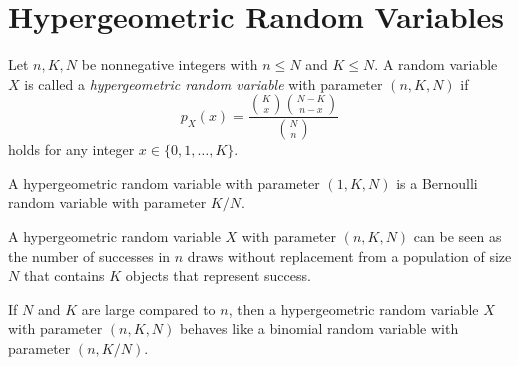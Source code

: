 \section{Hypergeometric Random Variables}
\begin{definition}
  Let $n, K, N$ be nonnegative integers with $n \leq N$ and $K \leq N$.
  A random variable $X$ is called a \emph{hypergeometric random variable}
  with parameter $(n, K, N)$ if
  \begin{equation*}
    p_X(x) = \frac{\binom{K}{x}\binom{N-K}{n-x}}{\binom{N}{n}}
  \end{equation*}
  holds for any integer $x \in \{0, 1, \dots, K\}$.
\end{definition}
\begin{remark}
  A hypergeometric random variable with parameter $(1, K, N)$ is a Bernoulli
  random variable with parameter $K/N$.
\end{remark}
\begin{remark}
  A hypergeometric random variable $X$ with parameter $(n, K, N)$ can be seen
  as the number of successes in $n$ draws without replacement from a
  population of size $N$ that contains $K$ objects that represent success.
\end{remark}
\begin{remark}
  If $N$ and $K$ are large compared to $n$, then a hypergeometric random
  variable $X$ with parameter $(n, K, N)$ behaves like a binomial
  random variable with parameter $(n, K/N)$.
\end{remark}